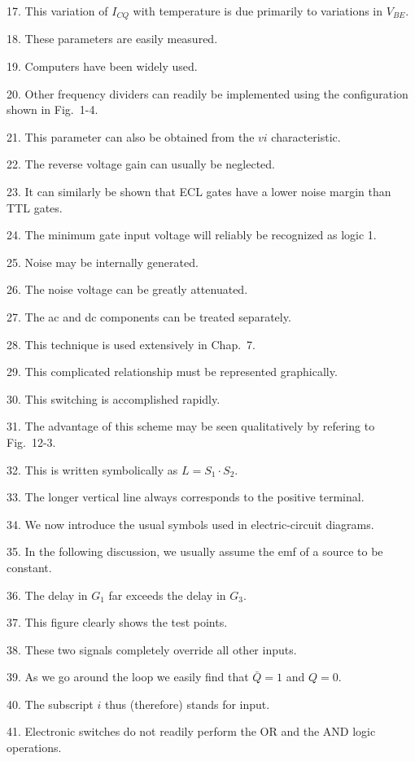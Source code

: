 \documentclass[a4paper,twocolumn,10pt]{article}
\begin{document}
\begin{CJK}{UTF8}{gkai}
	17. This variation of $I_{CQ}$ with temperature is due primarily to variations in $V_{BE}$.

	18. These parameters are easily measured.

	19. Computers have been widely used.

	20. Other frequency dividers can readily be implemented using the configuration shown
	in Fig.~1-4.

	21. This parameter can also be obtained from the $vi$ characteristic.

	22. The reverse voltage gain can usually be neglected.

	23. It can similarly be shown that ECL gates have a lower noise margin than TTL gates.

	24. The minimum gate input voltage will reliably be recognized as logic 1.

	25. Noise may be internally generated.

	26. The noise voltage can be greatly attenuated.

	27. The ac and dc components can be treated separately.

	28. This technique is used extensively in Chap.~7.

	29. This complicated relationship must be represented graphically.

	30. This switching is accomplished rapidly.

	31. The advantage of this scheme may be seen qualitatively by refering to Fig.~12-3.

	32. This is written symbolically as $L=S_1\cdot S_2$.

	33. The longer vertical line always corresponds to the positive terminal.

	34. We now introduce the usual symbols used in electric-circuit diagrams.

	35. In the following discussion, we usually assume the emf of a source to be constant.

	36. The delay in $G_1$ far exceeds the delay in $G_3$.

	37. This figure clearly shows the test points.

	38. These two signals completely override all other inputs.

	39. As we go around the loop we easily find that $\bar{Q} = 1$ and $Q = 0$.
	
	40. The subscript $i$ thus (therefore) stands for input.

	41. Electronic switches do not readily perform the OR and the AND logic operations.


\end{CJK}
\end{document}
